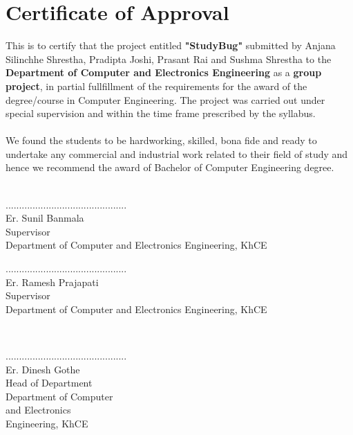 		\large
			\chapter*{Certificate of Approval}
		\normalsize
			This is to certify that the project entitled \textbf{"StudyBug"} submitted by Anjana Silinchhe Shrestha, Pradipta Joshi, Prasant Rai and Sushma Shrestha to the \textbf{Department of Computer and Electronics Engineering} as a \textbf{group project}, in partial fullfillment of the requirements for the award of the degree/course in Computer Engineering. The project was carried out under special supervision and within the time frame prescribed by the syllabus. \\
		    \\
			We found the students to be hardworking, skilled, bona fide and ready to undertake any commercial and industrial work related to their field of study and hence we recommend the award of Bachelor of Computer Engineering degree. \\
			\vspace{4cm} \\
			\begin{minipage}{2in}\centering
			.............................................\\[0.3cm]
			Er. Sunil Banmala\\
			Supervisor \\
			Department of Computer and Electronics Engineering, KhCE\\
			\end{minipage}\hfill
			\begin{minipage}{2in}\centering
			.............................................\\[0.3cm]
			Er. Ramesh Prajapati\\
			Supervisor \\
			Department of Computer and Electronics Engineering, KhCE\\
			\end{minipage}
			\\[3cm]
			\begin{center}
			.............................................\\[0.3cm]
			Er. Dinesh Gothe\\
			Head of Department\\
			Department of Computer\\
			and Electronics\\
			Engineering, KhCE\\
			\end{center}
		\break



